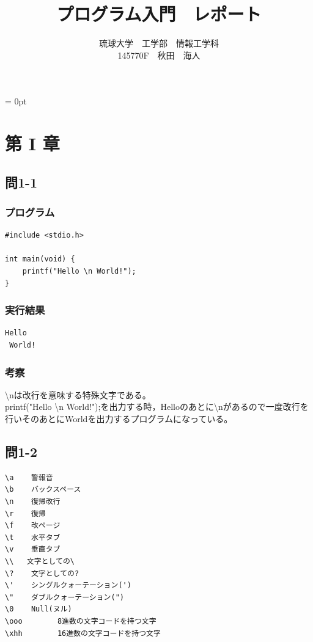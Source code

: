 \documentclass{jarticle}
\title{プログラム入門　レポート}
\author{琉球大学　工学部　情報工学科\\145770F　秋田　海人}
\date{}
\begin{document}
\maketitle
\parindent = 0pt


\section{第 I 章\\}
\subsection{問1-1\\}
\subsubsection{プログラム\\}
\begin{breakbox}
\begin{verbatim}
#include <stdio.h>

int main(void) {
	printf("Hello \n World!");
}
\end{verbatim}
\end{breakbox}
\subsubsection{実行結果\\}
\begin{breakbox}
\begin{verbatim}
Hello 
 World!
\end{verbatim}
\end{breakbox}
\subsubsection{考察\\}
\textbackslash{n}は改行を意味する特殊文字である。\\
printf("Hello \textbackslash{n} World!");を出力する時，Helloのあとに\textbackslash{n}があるので一度改行を行いそのあとにWorldを出力するプログラムになっている。\\
\newpage
\subsection{問1-2\\}
\begin{breakbox}
\begin{verbatim}
\a    警報音
\b    バックスペース
\n    復帰改行
\r    復帰
\f    改ページ
\t    水平タブ
\v    垂直タブ
\\   文字としての\
\?    文字としての?
\'    シングルクォーテーション(')
\"    ダブルクォーテーション(")
\0    Null(ヌル)
\ooo	    8進数の文字コードを持つ文字
\xhh	    16進数の文字コードを持つ文字
\end{verbatim}
\end{breakbox}
\end{document}

